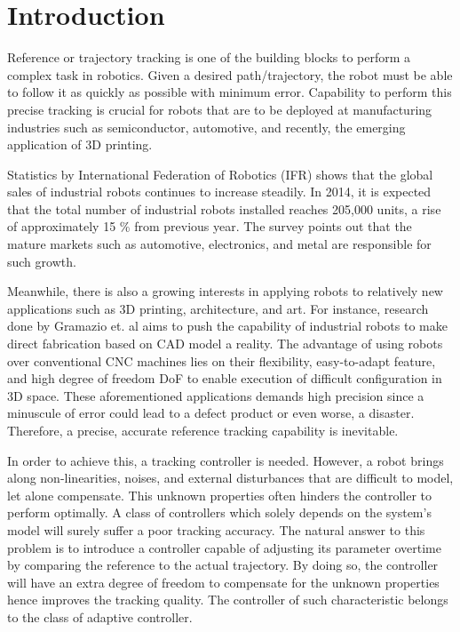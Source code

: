 %
\chapter{Introduction} \label{chap::intro}
Reference or trajectory tracking is one of the building blocks to perform a complex task in robotics. Given a desired path/trajectory, the robot must be able to follow it as quickly as possible with minimum error. Capability to perform this precise tracking is crucial for robots that are to be deployed at manufacturing industries such as semiconductor, automotive, and recently, the emerging application of 3D printing. 

Statistics by International Federation of Robotics (IFR) \cite{IFR2014} shows that the global sales of industrial robots continues to increase steadily. In 2014, it is expected that the total number of industrial robots installed reaches 205,000 units, a rise of approximately 15 \% from previous year. The survey points out that the mature markets such as automotive, electronics, and metal are responsible for such growth. 

Meanwhile, there is also a growing interests in applying robots to relatively new applications such as 3D printing, architecture, and art. For instance, research done by Gramazio et. al \cite{Helm2014} \cite{Lloret2014} aims to push the capability of industrial robots to make direct fabrication based on CAD model a reality. The advantage of using robots over conventional CNC machines lies on their flexibility, easy-to-adapt feature, and high degree of freedom \ac{DoF} to enable execution of difficult configuration in \ac{3D} space. These aforementioned applications demands high precision since a minuscule of error could lead to a defect product or even worse, a disaster. Therefore, a precise, accurate reference tracking capability is inevitable.

In order to achieve this, a tracking controller is needed. However, a robot brings along non-linearities, noises, and external disturbances that are difficult to model, let alone compensate. This unknown properties often hinders the controller to perform optimally. A class of controllers which solely depends on the system's model will surely suffer a poor tracking accuracy. The natural answer to this problem is to introduce a controller capable of adjusting its parameter overtime by comparing the reference to the actual trajectory. By doing so, the controller will have an extra degree of freedom to compensate for the unknown properties hence improves the tracking quality. The controller of such characteristic belongs to the class of adaptive controller.

